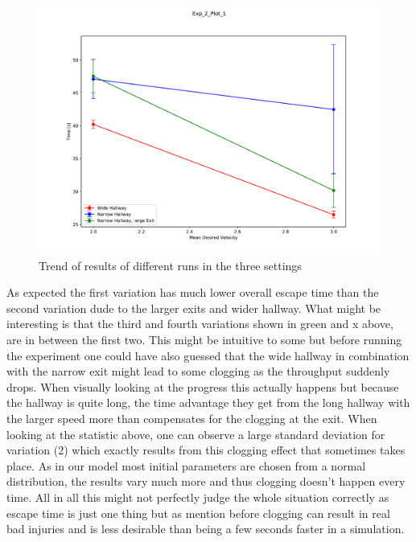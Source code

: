 \documentclass[11pt]{article}
\begin{document}
\begin{figure}[H]
	\centering
	\includegraphics[width=1\linewidth]{assets/Exp_2_Plot_1}\\
	Trend of results of different runs in the three settings
\end{figure}

As expected the first variation has much lower overall escape time than the second variation dude to the larger exits and wider hallway. What might be interesting is that the third and fourth variations shown in green and x above, are in between the first two. This might be intuitive to some but before running the experiment one could have also guessed that the wide hallway in combination with the narrow exit might lead to some clogging as the throughput suddenly drops. When visually looking at the progress this actually happens but because the hallway is quite long, the time advantage they get from the long hallway with the larger speed more than compensates for the clogging at the exit. When looking at the statistic above, one can observe a large standard deviation for variation (2) which exactly results from this clogging effect that sometimes takes place. As in our model most initial parameters are chosen from a normal distribution, the results vary much more and thus clogging doesn't happen every time. All in all this might not perfectly judge the whole situation correctly as escape time is just one thing but as mention before clogging can result in real bad injuries and is less desirable than being a few seconds faster in a simulation.
\end{document}
